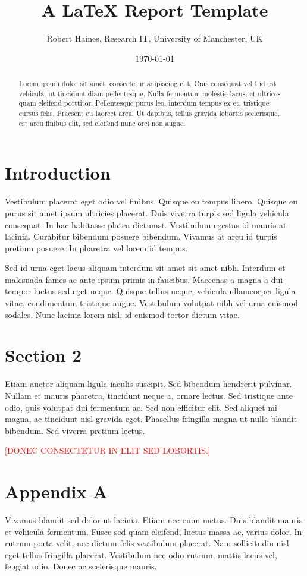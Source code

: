 \documentclass[11pt]{article}
\newcommand{\notetoself}[1]{\textcolor{red}{[\uppercase{#1}]}}
\begin{document}
\title{A {\LaTeX} Report Template}
\author{Robert Haines, Research IT, University of Manchester, UK}
\date{\today}
\maketitle

\begin{abstract}
Lorem ipsum dolor sit amet, consectetur adipiscing elit. Cras consequat velit id est vehicula, ut tincidunt diam pellentesque. Nulla fermentum molestie lacus, et ultrices quam eleifend porttitor. Pellentesque purus leo, interdum tempus ex et, tristique cursus felis. Praesent eu laoreet arcu. Ut dapibus, tellus gravida lobortis scelerisque, est arcu finibus elit, sed eleifend nunc orci non augue.
\end{abstract}

\section{Introduction}

Vestibulum placerat eget odio vel finibus. Quisque eu tempus libero. Quisque eu purus sit amet ipsum ultricies placerat. Duis viverra turpis sed ligula vehicula consequat. In hac habitasse platea dictumst. Vestibulum egestas id mauris at lacinia. Curabitur bibendum posuere bibendum. Vivamus at arcu id turpis pretium posuere. In pharetra vel lorem id tempus.

Sed id urna eget lacus aliquam interdum sit amet sit amet nibh. Interdum et malesuada fames ac ante ipsum primis in faucibus. Maecenas a magna a dui tempor luctus sed eget neque. Quisque tellus neque, vehicula ullamcorper ligula vitae, condimentum tristique augue. Vestibulum volutpat nibh vel urna euismod sodales. Nunc lacinia lorem nisl, id euismod tortor dictum vitae.

\section{Section 2}

Etiam auctor aliquam ligula iaculis suscipit. Sed bibendum hendrerit pulvinar. Nullam et mauris pharetra, tincidunt neque a, ornare lectus. Sed tristique ante odio, quis volutpat dui fermentum ac. Sed non efficitur elit. Sed aliquet mi magna, ac tincidunt nisl gravida eget. Phasellus fringilla magna ut nulla blandit bibendum. Sed viverra pretium lectus.

\notetoself{Donec consectetur in elit sed lobortis.}

\appendix

\section{Appendix A}

Vivamus blandit sed dolor ut lacinia. Etiam nec enim metus. Duis blandit mauris et vehicula fermentum. Fusce sed quam eleifend, luctus massa ac, varius dolor. In rutrum porta velit, nec dictum felis vestibulum placerat. Nam sollicitudin nisl eget tellus fringilla placerat. Vestibulum nec odio rutrum, mattis lacus vel, feugiat odio. Donec ac scelerisque mauris.
\end{document}
